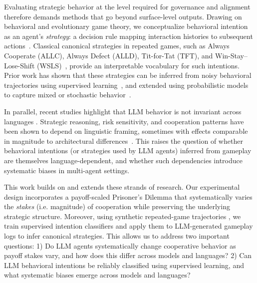 \documentclass{article}
\begin{document}
Evaluating strategic behavior at the level required for governance and alignment therefore demands methods that go beyond surface-level outputs. Drawing on behavioral and evolutionary game theory, we conceptualize behavioral intention as an agent’s \emph{strategy}: a decision rule mapping interaction histories to subsequent actions~\cite{han2011role,diStefanoIntention2023,Han2012ALIFEjournal,fujimoto2019functional}. Classical canonical strategies in repeated games, such as Always Cooperate (ALLC), Always Defect (ALLD), Tit-for-Tat (TFT), and Win-Stay–Lose-Shift (WSLS)~\cite{Axelrod1980Effective,sigmund:2010bo}, provide an interpretable vocabulary for such intentions. Prior work has shown that these strategies can be inferred from noisy behavioral trajectories using supervised learning~\cite{han2011role,diStefanoIntention2023}, and extended using probabilistic models to capture mixed or stochastic behavior~\cite{inferenceStrategies}.

In parallel, recent studies highlight that LLM behavior is not invariant across languages \cite{buscemi2025fairgame}. Strategic reasoning, risk sensitivity, and cooperation patterns have been shown to depend on linguistic framing, sometimes with effects comparable in magnitude to architectural differences~\cite{loreheydari2024strategic,buscemi2025llms}. This raises the question of whether behavioral intentions (or strategies used by LLM agents) inferred from gameplay are themselves language-dependent, and whether such dependencies introduce systematic biases in multi-agent settings.

This work builds on and extends these strands of research. Our experimental design incorporates a payoff-scaled Prisoner’s Dilemma that systematically  varies the \emph{stakes} (i.e. magnitude) of cooperation while preserving the underlying strategic structure. Moreover, using synthetic repeated-game trajectories \cite{han2011role}, we train supervised intention classifiers and apply them to LLM-generated gameplay logs to infer canonical strategies. This allows us to address two important questions:  
1) Do LLM agents systematically change cooperative behavior as payoff stakes vary, and how does this differ across models and languages?  
2) Can LLM behavioral intentions be reliably classified using supervised learning, and what systematic biases emerge across models and languages?
\end{document}
